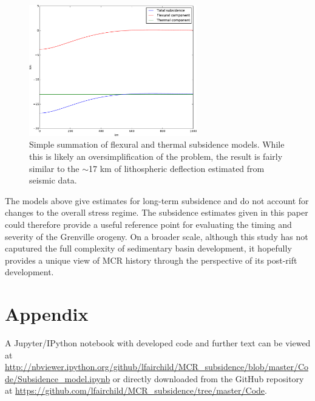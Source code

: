 \documentclass[12pt,letterpaper]{article}
\begin{document}
\begin{figure}
\noindent\includegraphics[width=0.65\textwidth]{figures/combined_sub.pdf}
\caption{\footnotesize{Simple summation of flexural and thermal subsidence models. While this is likely an oversimplification of the problem, the result is fairly similar to the $\sim$17 km of lithospheric deflection estimated from seismic data.}}
\label{fig:combined_sub}
\end{figure}
The models above give estimates for long-term subsidence and do not account for changes to the overall stress regime. The subsidence estimates given in this paper could therefore provide a useful reference point for evaluating the timing and severity of the Grenville orogeny. On a broader scale, although this study has not caputured the full complexity of sedimentary basin development, it hopefully provides a unique view of MCR history through the perspective of its post-rift development.\par

\clearpage
\section*{Appendix}
A Jupyter/IPython notebook with developed code and further text can be viewed at \url{http://nbviewer.ipython.org/github/lfairchild/MCR_subsidence/blob/master/Code/Subsidence_model.ipynb} or directly downloaded from the GitHub repository at \url{https://github.com/lfairchild/MCR_subsidence/tree/master/Code}.
\end{document}
